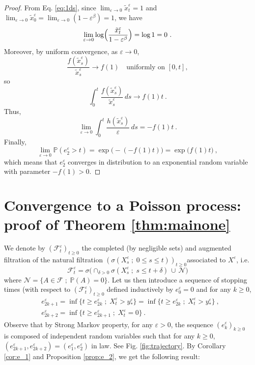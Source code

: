 \documentclass[reqno, 12pt, a4paper]{amsart}
\theoremstyle{plain}
\theoremstyle{definition}
\begin{document}
\begin{proof}
\medskip
From Eq. \eqref{eq:1ds}, since $\lim_{\varepsilon \to 0} \tilde{x}_t^\varepsilon =1$ and $ \lim_{\varepsilon \to 0} \tilde{x}_0^\varepsilon =\lim_{\varepsilon \to 0} ( 1-\varepsilon^\beta)=1$, we have
\[
\lim_{\varepsilon \to 0} \log\Bigl( \frac{\tilde{x}_t^\varepsilon}{1-\varepsilon^\beta} \Bigr)= \log 1 = 0 \ .
\]
Moreover, by uniform convergence, as $\varepsilon \to 0$,
\[
\frac{f(\tilde{x}_s^\varepsilon)}{\tilde{x}_s^\varepsilon} \longrightarrow f(1) \quad \text{uniformly on }[0,t],
\]
so
\[
\int_0^t \frac{f(\tilde{x}_s^\varepsilon)}{\tilde{x}_s^\varepsilon} \, ds \longrightarrow f(1)t \ .
\]
Thus,
\[
\lim_{\varepsilon\to0} \int_0^t \frac{h(\tilde{x}_s^\varepsilon)}{\varepsilon} \, ds = -f(1)t \ .
\]
Finally,
\[
\lim_{\varepsilon\to0} \mathbb{P}(e_2^\varepsilon > t) = \exp\bigl( -(-f(1)t) \bigr) = \exp\bigl( f(1)t \bigr) \ ,
\]
which means that \( e_2^\varepsilon \) converges in distribution to an exponential random variable with parameter \( -f(1) > 0 \).

\end{proof}


\section{Convergence to a Poisson process: proof of Theorem \ref{thm:mainone}}
\label{sec:proofofThm}


We denote by $(\mathcal F_t^\varepsilon)_{t \ge 0}$ the completed (by negligible sets) and augmented filtration of the natural filtration $(\sigma (X_s^\varepsilon \; ; \; 0 \le s \le t) )_{t \ge 0} $associated to $X^\varepsilon$, i.e. 
$$\mathcal F_t^\varepsilon = \sigma \Big( \cap_{ \delta>0} \sigma ( X_s^\varepsilon \; ; \; s \le t+\delta) \, \cup \,  \mathcal N\Big)$$ 
where $\mathcal N = \{ A \in \mathcal F \; ; \; \mathbb P (A) =0\}$. Let us then introduce a sequence of stopping times (with respect to $(\mathcal F_t^\varepsilon)_{t \ge 0}$ defined inductively by $e_0^\varepsilon=0$ and for any $k\ge 0$,
\begin{equation}
\begin{split}
&e_{2k+1}^\varepsilon = \inf \{ t \ge e_{2k}^\varepsilon  \; ; \; X_t^\varepsilon >y_*^\varepsilon \} = \inf \{ t \ge e_{2k}^\varepsilon  \; ; \; X_t^\varepsilon >y_*^\varepsilon \} \ ,  \\  
&e_{2k+2}^{\varepsilon} = \inf \{ t \ge e_{2k+1}^\varepsilon  \; ; \; X_t^\varepsilon = 0 \} \ . 
\end{split}
\end{equation} 
Observe that by Strong Markov property, for any $\varepsilon>0$, the sequence $(e_k^\varepsilon)_{k \ge 0}$ is composed of independent random variables such that for any $k\ge 0$, $(e_{2k+1}^\varepsilon, e_{2k+2}^\varepsilon) = (e_1^\varepsilon, e_2^\varepsilon)$ in law. See Fig. \ref{fig:trajectory}. By Corollary \ref{cor:e_1} and Proposition \ref{prop:e_2}, we get the following result:
\end{document}

